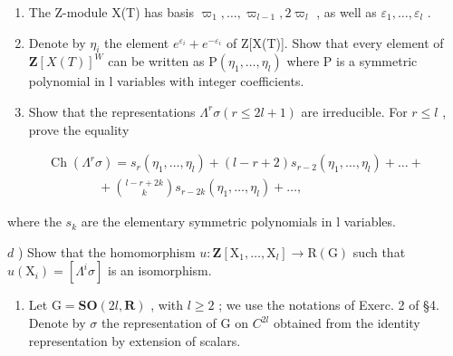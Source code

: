\begin{enumerate}
\begin{enumerate}
\def\labelenumi{\alph{enumi})}
\item
  The Z-module X(T) has basis \(\varpi_{1},\ldots,\varpi_{l-1},2\varpi_{l}\) , as well as \(\varepsilon_{1},\ldots,\varepsilon_{l}\) .
\item
  Denote by \(\eta_{i}\) the element \(e^{\varepsilon_{i}} + e^{-\varepsilon_{i}}\) of Z{[}X(T){]}. Show that every element of \(\mathbf{Z}[X(T)]^{W}\) can be written as \(\mathrm{P}(\eta_{1}, \ldots, \eta_{l})\) where P is a symmetric polynomial in l variables with integer coefficients.
\item
  Show that the representations \(\Lambda^r\sigma (r\leq 2l + 1)\) are irreducible. For \(r\leq l\) , prove the equality
\end{enumerate}

\[
\begin{array}{c} \operatorname{Ch} (\Lambda^ {r}   \sigma) = s _ {r} (\eta_ {1}, \ldots , \eta_ {l}) + (l - r + 2) s _ {r - 2} (\eta_ {1}, \ldots , \eta_ {l}) + \dots + \\ \qquad \qquad + \binom {l - r + 2 k} {k} s _ {r - 2 k} (\eta_ {1}, \ldots , \eta_ {l}) + \dots , \end{array}
\]

where the \(s_{k}\) are the elementary symmetric polynomials in l variables.

\(d\) ) Show that the homomorphism \(u:\mathbf{Z}[\mathrm{X}_1,\dots ,\mathrm{X}_l]\to \mathrm{R}(\mathrm{G})\) such that \(u(\mathrm{X}_i) = [\Lambda^i\sigma ]\) is an isomorphism.

\begin{enumerate}
\def\labelenumi{\arabic{enumi})}
\setcounter{enumi}{2}
\tightlist
\item
  Let \(\mathrm{G} = \mathbf{SO}(2l, \mathbf{R})\) , with \(l \geq 2\) ; we use the notations of Exerc. 2 of §4. Denote by \(\sigma\) the representation of G on \(C^{2l}\) obtained from the identity representation by extension of scalars.
\end{enumerate}


\end{enumerate}
